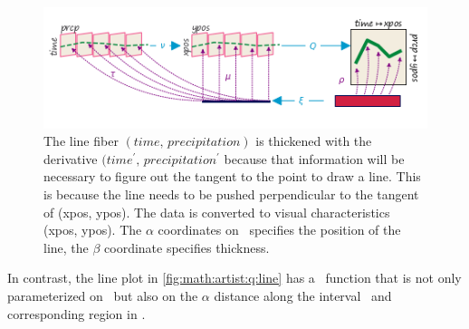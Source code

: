 \documentclass[../main.tex]{subfiles}
\begin{document}
\begin{figure}[H]
    \includegraphics[width=\textwidth]{figures/math/line.png}
    \caption{The line fiber \((time,\, precipitation)\) is thickened with the derivative $(time^{\prime},\, precipitation^{\prime}$ because that information will be necessary to figure out the tangent to the point to draw a line. This is because the line needs to be pushed perpendicular to the tangent of (xpos, ypos). The data is converted to visual characteristics (xpos, ypos). The $\alpha$ coordinates on \gbase\ specifies the position of the line, the $\beta$ coordinate specifies thickness.}
    \label{fig:math:artist:q:line}
\end{figure}
In contrast, the line plot in \autoref{fig:math:artist:q:line} has a \vindex\ function that is not only parameterized on \dbasepoint\ but also on the $\alpha$ distance along the interval \dbasepoint\ and corresponding region in \gbase. 
\end{document}
